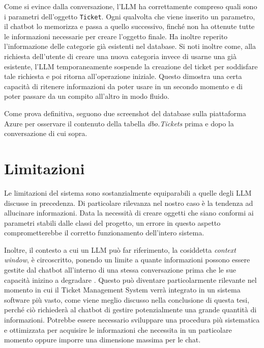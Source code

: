 Come si evince dalla conversazione, l'LLM ha correttamente compreso quali sono i parametri dell'oggetto \texttt{Ticket}. Ogni qualvolta che viene
inserito un parametro, il chatbot lo memorizza e passa a quello successivo, finché non ha ottenute tutte le informazioni necessarie per creare l'oggetto finale.
Ha inoltre reperito l'informazione delle categorie già esistenti nel database. Si noti inoltre come, alla richiesta dell'utente di creare una nuova categoria invece di usarne una
già esistente, l'LLM temporaneamente sospende la creazione del ticket per soddisfare tale richiesta e poi ritorna all'operazione iniziale. Questo dimostra una certa capacità
di ritenere informazioni da poter usare in un secondo momento e di poter passare da un compito all'altro in modo fluido.

\newpage
Come prova definitiva, seguono due screenshot del database sulla piattaforma Azure per osservare il contenuto della tabella \textit{dbo.Tickets} 
prima e dopo la conversazione di cui sopra.



\newpage
\section{Limitazioni}
Le limitazioni del sistema sono sostanzialmente equiparabili a quelle degli LLM discusse in precedenza. Di particolare rilevanza nel nostro caso è la tendenza ad allucinare informazioni.
Data la necessità di creare oggetti che siano conformi ai parametri stabili dalle classi del progetto, un errore in questo aspetto comprometterebbe il corretto funzionamento dell'intero sistema.

Inoltre, il contesto a cui un LLM può far riferimento, la cosiddetta \textit{context window}, è circoscritto, ponendo un limite a quante informazioni possono essere gestite dal chatbot
all'interno di una stessa conversazione prima che le sue capacità inizino a degradare \cite{ibm_context_window}. Questo può diventare particolarmente rilevante nel momento in cui il Ticket Management System verrà
integrato in un sistema software più vasto, come viene meglio discusso nella conclusione di questa tesi, perché ciò richiederà al chatbot di gestire potenzialmente una grande quantità di informazioni.
Potrebbe essere necessario sviluppare una procedura più sistematica e ottimizzata per acquisire le informazioni che necessita in un particolare momento oppure imporre
una dimensione massima per le chat.
